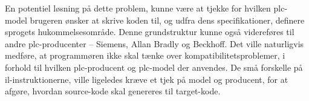 En potentiel løsning på dette problem, kunne være at tjekke for hvilken \gls{plc}-model brugeren ønsker at skrive koden til, og udfra dens specifikationer, definere sprogets hukommelsesområde. Denne grundstruktur kunne også videreføres til andre \gls{plc}-producenter – Siemens, Allan Bradly og Beckhoff. Det ville naturligvis medføre, at programmøren ikke skal tænke over kompatibilitetsproblemer, i forhold til hvilken \gls{plc}-producent og \gls{plc}-model der anvendes. 
De små forskelle på \gls{il}-instruktionerne, ville ligeledes kræve et tjek på model og producent, for at afgøre, hvordan source-kode skal genereres til target-kode.







